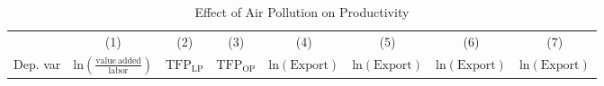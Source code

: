 \documentclass[12pt]{article}
\begin{document}
    \begin{table}[H]\centering
    \caption{Effect of Air Pollution on Productivity} \label{tab:mechan_tfp}
      \resizebox{\textwidth}{!}
  {
    \begin{tabular}{l*{7}{c}}
    \hline\hline
    &\multicolumn{1}{c}{(1)}&\multicolumn{1}{c}{(2)}&\multicolumn{1}{c}{(3)}&\multicolumn{1}{c}{(4)}&\multicolumn{1}{c}{(5)}&\multicolumn{1}{c}{(6)}&\multicolumn{1}{c}{(7)}\\
    Dep. var  &\multicolumn{1}{c}{$\mathrm{ln(\frac{value\ added}{labor})}$}&\multicolumn{1}{c}{$\mathrm{TFP_{LP}}$}&\multicolumn{1}{c}{$\mathrm{TFP_{OP}}$}&\multicolumn{1}{c}{$\mathrm{ln(Export)}$}&\multicolumn{1}{c}{$\mathrm{ln(Export)}$}&\multicolumn{1}{c}{$\mathrm{ln(Export)}$}&\multicolumn{1}{c}{$\mathrm{ln(Export)}$}\\ 
     \hline
     

\end{tabular}}
\end{table}
\end{document}

